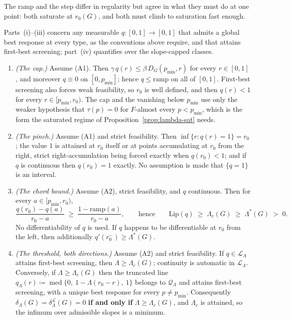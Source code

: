 \documentclass[acmsmall,nonacm,screen]{acmart}
\theoremstyle{acmplain}%
\theoremstyle{acmdefinition}%
\numberwithin{equation}{section}
\begin{document}
The ramp and the step differ in regularity but agree in what they must do at one point: both saturate at $r_0(G)$, and both must climb to saturation fast enough.

\begin{theorem}\label{thm:critical-slope}
Parts~(i)--(iii) concern any measurable $q : [0,1] \to [0,1]$ that admits a global best response at every type, as the conventions above require, and that attains first-best screening; part~(iv) quantifies over the slope-capped classes.
\begin{enumerate}
\item[(i)] \emph{(The cap.)} Assume (A1). Then $\gamma\, q(r) \le \beta\, D_G(p_{\min},r)$ for every $r \in [0,1]$, and moreover $q \equiv 0$ on $[0,p_{\min}]$; hence $q \le \mathrm{ramp}$ on all of $[0,1]$. First-best screening also forces weak feasibility, so $r_0$ is well defined, and then $q(r) < 1$ for every $r \in [p_{\min},r_0)$. The cap and the vanishing below $p_{\min}$ use only the weaker hypothesis that $\tau(p) = 0$ for $F$-almost every $p < p_{\min}$, which is the form the saturated regime of Proposition~\ref{prop:lambda-sat} needs.
\item[(ii)] \emph{(The pinch.)} Assume (A1) and strict feasibility. Then $\inf\{r : q(r) = 1\} = r_0$; the value $1$ is attained at $r_0$ itself or at points accumulating at $r_0$ from the right, strict right-accumulation being forced exactly when $q(r_0) < 1$; and if $q$ is continuous then $q(r_0) = 1$ exactly. No assumption is made that $\{q = 1\}$ is an interval.
\item[(iii)] \emph{(The chord bound.)} Assume (A2), strict feasibility, and $q$ continuous. Then for every $a \in [p_{\min},r_0)$,
\[
\frac{q(r_0)-q(a)}{r_0-a} \;\ge\; \frac{1-\mathrm{ramp}(a)}{r_0-a}, \qquad\text{hence}\qquad \mathrm{Lip}(q) \;\ge\; \Lambda_c(G) \;\ge\; \Lambda^*(G) \;>\; 0 .
\]
No differentiability of $q$ is used. If $q$ happens to be differentiable at $r_0$ from the left, then additionally $q'(r_0^-) \ge \Lambda^*(G)$.
\item[(iv)] \emph{(The threshold, both directions.)} Assume (A2) and strict feasibility. If $q \in \mathcal L_\Lambda$ attains first-best screening, then $\Lambda \ge \Lambda_c(G)$; continuity is automatic in $\mathcal L_\Lambda$. Conversely, if $\Lambda \ge \Lambda_c(G)$ then the truncated line $q_\Lambda(r) \coloneqq \operatorname{med}\{0,\ 1-\Lambda(r_0-r),\ 1\}$ belongs to $\mathcal Q_\Lambda$ and attains first-best screening, with a unique best response for every $p \ne p_{\min}$. Consequently $\delta_\Lambda(G) = \delta^{\mathcal L}_\Lambda(G) = 0$ \textbf{if and only if} $\Lambda \ge \Lambda_c(G)$, and $\Lambda_c$ is attained, so the infimum over admissible slopes is a minimum.
\end{enumerate}
\end{theorem}
\end{document}
